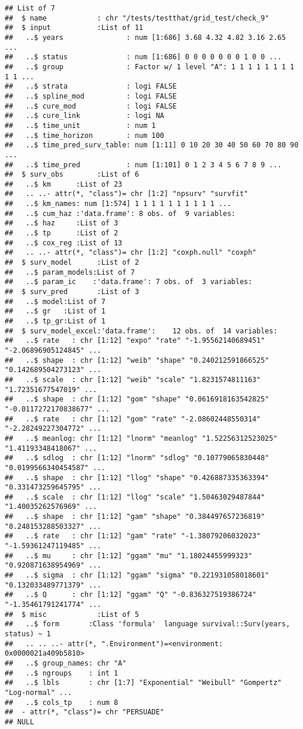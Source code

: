 \documentclass[
]{article}
\begin{document}
\begin{verbatim}
## List of 7
##  $ name            : chr "/tests/testthat/grid_test/check_9"
##  $ input           :List of 11
##   ..$ years               : num [1:686] 3.68 4.32 4.82 3.16 2.65 ...
##   ..$ status              : num [1:686] 0 0 0 0 0 0 0 1 0 0 ...
##   ..$ group               : Factor w/ 1 level "A": 1 1 1 1 1 1 1 1 1 1 ...
##   ..$ strata              : logi FALSE
##   ..$ spline_mod          : logi FALSE
##   ..$ cure_mod            : logi FALSE
##   ..$ cure_link           : logi NA
##   ..$ time_unit           : num 1
##   ..$ time_horizon        : num 100
##   ..$ time_pred_surv_table: num [1:11] 0 10 20 30 40 50 60 70 80 90 ...
##   ..$ time_pred           : num [1:101] 0 1 2 3 4 5 6 7 8 9 ...
##  $ surv_obs        :List of 6
##   ..$ km      :List of 23
##   .. ..- attr(*, "class")= chr [1:2] "npsurv" "survfit"
##   ..$ km_names: num [1:574] 1 1 1 1 1 1 1 1 1 1 ...
##   ..$ cum_haz :'data.frame': 8 obs. of  9 variables:
##   ..$ haz     :List of 3
##   ..$ tp      :List of 2
##   ..$ cox_reg :List of 13
##   .. ..- attr(*, "class")= chr [1:2] "coxph.null" "coxph"
##  $ surv_model      :List of 2
##   ..$ param_models:List of 7
##   ..$ param_ic    :'data.frame': 7 obs. of  3 variables:
##  $ surv_pred       :List of 3
##   ..$ model:List of 7
##   ..$ gr   :List of 1
##   ..$ tp_gr:List of 1
##  $ surv_model_excel:'data.frame':    12 obs. of  14 variables:
##   ..$ rate   : chr [1:12] "expo" "rate" "-1.95562140689451" "-2.06896905124845" ...
##   ..$ shape  : chr [1:12] "weib" "shape" "0.240212591866525" "0.142689504273123" ...
##   ..$ scale  : chr [1:12] "weib" "scale" "1.8231574811163" "1.72351677547019" ...
##   ..$ shape  : chr [1:12] "gom" "shape" "0.0616918163542825" "-0.0117272170838677" ...
##   ..$ rate   : chr [1:12] "gom" "rate" "-2.08602448550314" "-2.28249227304772" ...
##   ..$ meanlog: chr [1:12] "lnorm" "meanlog" "1.52256312523025" "1.41193348418067" ...
##   ..$ sdlog  : chr [1:12] "lnorm" "sdlog" "0.10779065830448" "0.0199566340454587" ...
##   ..$ shape  : chr [1:12] "llog" "shape" "0.426887335363394" "0.331473259645795" ...
##   ..$ scale  : chr [1:12] "llog" "scale" "1.50463029487844" "1.40035262576969" ...
##   ..$ shape  : chr [1:12] "gam" "shape" "0.384497657236819" "0.248153288503327" ...
##   ..$ rate   : chr [1:12] "gam" "rate" "-1.38079206032023" "-1.59361247119485" ...
##   ..$ mu     : chr [1:12] "ggam" "mu" "1.18024455999323" "0.920871638954969" ...
##   ..$ sigma  : chr [1:12] "ggam" "sigma" "0.221931058018601" "0.132033489771379" ...
##   ..$ Q      : chr [1:12] "ggam" "Q" "-0.836327519386724" "-1.35461791241774" ...
##  $ misc            :List of 5
##   ..$ form       :Class 'formula'  language survival::Surv(years, status) ~ 1
##   .. .. ..- attr(*, ".Environment")=<environment: 0x0000021a409b5810> 
##   ..$ group_names: chr "A"
##   ..$ ngroups    : int 1
##   ..$ lbls       : chr [1:7] "Exponential" "Weibull" "Gompertz" "Log-normal" ...
##   ..$ cols_tp    : num 8
##  - attr(*, "class")= chr "PERSUADE"
## NULL
\end{verbatim}
\end{document}
